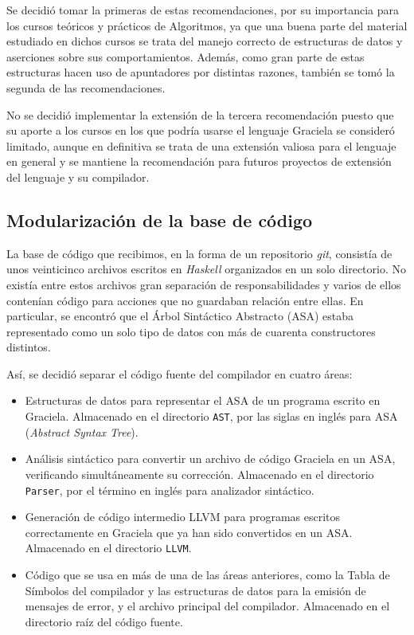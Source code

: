 Se decidió tomar la primeras de estas recomendaciones, por su importancia para
los cursos teóricos y prácticos de Algoritmos, ya que una buena parte del
material estudiado en dichos cursos se trata del manejo correcto de estructuras
de datos y aserciones sobre sus comportamientos. Además, como gran parte de
estas estructuras hacen uso de apuntadores por distintas razones, también se
tomó la segunda de las recomendaciones.

No se decidió implementar la extensión de la tercera recomendación puesto que su
aporte a los cursos en los que podría usarse el lenguaje Graciela se consideró
limitado, aunque en definitiva se trata de una extensión valiosa para el
lenguaje en general y se mantiene la recomendación para futuros proyectos de
extensión del lenguaje y su compilador.

\subsection{Modularización de la base de código}

La base de código que recibimos, en la forma de un repositorio \emph{git},
consistía de unos veinticinco archivos escritos en \emph{Haskell} organizados en
un solo directorio. No existía entre estos archivos gran separación de
responsabilidades y varios de ellos contenían código para acciones que no
guardaban relación entre ellas. En particular, se encontró que el Árbol
Sintáctico Abstracto (\textsc{ASA}) estaba representado como un solo tipo de
datos con más de cuarenta constructores distintos.

Así, se decidió separar el código fuente del compilador en cuatro áreas:
\begin{itemize}

  \item Estructuras de datos para representar el \textsc{ASA} de un programa
  escrito en Graciela. Almacenado en el directorio \texttt{AST}, por las siglas
  en inglés para \textsc{ASA} (\emph{Abstract Syntax Tree}).

  \item Análisis sintáctico para convertir un archivo de código Graciela en un
  ASA, verificando simultáneamente su corrección. Almacenado en el directorio
  \texttt{Parser}, por el término en inglés para analizador sintáctico.

  \item Generación de código intermedio LLVM para programas escritos
  correctamente en Graciela que ya han sido convertidos en un ASA. Almacenado en el
  directorio \texttt{LLVM}.

  \item Código que se usa en más de una de las áreas anteriores, como la Tabla
  de Símbolos del compilador y las estructuras de datos para la emisión de
  mensajes de error, y el archivo principal del compilador. Almacenado en el
  directorio raíz del código fuente.

\end{itemize}

